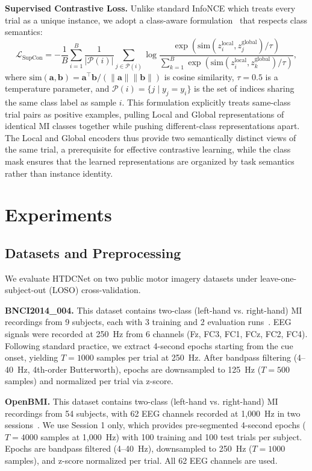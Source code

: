 \documentclass[conference]{IEEEtran}
\begin{document}
\textbf{Supervised Contrastive Loss.}
Unlike standard InfoNCE which treats every trial as a unique instance, we adopt a class-aware formulation~\cite{khosla2020supcon} that respects class semantics:
\begin{equation}
    \mathcal{L}_{\text{SupCon}} = -\frac{1}{B}\sum_{i=1}^{B} \frac{1}{|\mathcal{P}(i)|} \sum_{j \in \mathcal{P}(i)} \log \frac{\exp(\text{sim}(z_i^{\text{local}}, z_j^{\text{global}}) / \tau)}{\sum_{k=1}^{B} \exp(\text{sim}(z_i^{\text{local}}, z_k^{\text{global}}) / \tau)},
\end{equation}
where $\text{sim}(\mathbf{a}, \mathbf{b}) = \mathbf{a}^{\top}\mathbf{b} / (\|\mathbf{a}\| \|\mathbf{b}\|)$ is cosine similarity, $\tau = 0.5$ is a temperature parameter, and $\mathcal{P}(i) = \{j \mid y_j = y_i\}$ is the set of indices sharing the same class label as sample $i$.
This formulation explicitly treats same-class trial pairs as positive examples, pulling Local and Global representations of identical MI classes together while pushing different-class representations apart.
The Local and Global encoders thus provide two semantically distinct views of the same trial, a prerequisite for effective contrastive learning, while the class mask ensures that the learned representations are organized by task semantics rather than instance identity.

\section{Experiments}
\label{sec:experiments}

\subsection{Datasets and Preprocessing}
We evaluate HTDCNet on two public motor imagery datasets under leave-one-subject-out (LOSO) cross-validation.

\textbf{BNCI2014\_004.}
This dataset contains two-class (left-hand vs. right-hand) MI recordings from 9 subjects, each with 3 training and 2 evaluation runs~\cite{tangermann2012bciciv}.
EEG signals were recorded at 250~Hz from 6 channels (Fz, FC3, FC1, FCz, FC2, FC4).
Following standard practice, we extract 4-second epochs starting from the cue onset, yielding $T=1000$ samples per trial at 250~Hz.
After bandpass filtering (4--40~Hz, 4th-order Butterworth), epochs are downsampled to 125~Hz ($T=500$ samples) and normalized per trial via z-score.

\textbf{OpenBMI.}
This dataset contains two-class (left-hand vs. right-hand) MI recordings from 54 subjects, with 62 EEG channels recorded at 1,000~Hz in two sessions~\cite{lee2019openbmi}.
We use Session 1 only, which provides pre-segmented 4-second epochs ($T=4000$ samples at 1,000~Hz) with 100 training and 100 test trials per subject.
Epochs are bandpass filtered (4--40~Hz), downsampled to 250~Hz ($T=1000$ samples), and z-score normalized per trial.
All 62 EEG channels are used.
\end{document}
